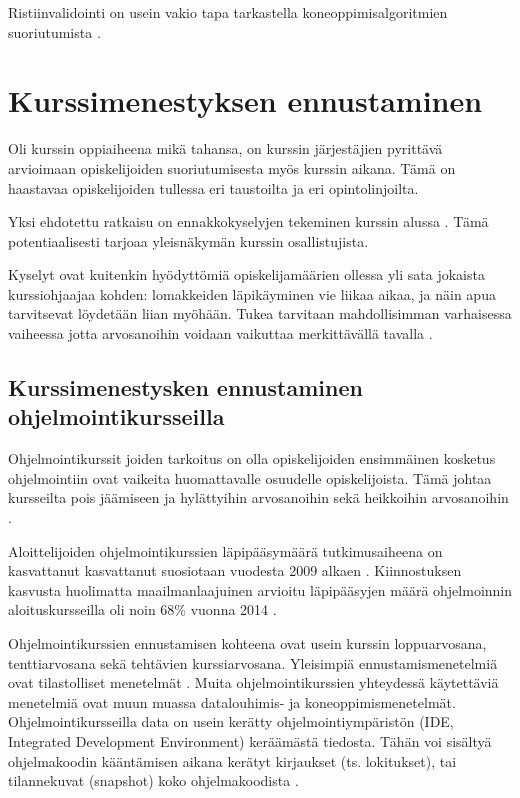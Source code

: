 \documentclass[finnish,twoside,openright]{HYgraduMLDS}
\begin{document}
Ristiinvalidointi on usein vakio tapa tarkastella koneoppimisalgoritmien suoriutumista \cite{james2013ISLR}.

 
\section{Kurssimenestyksen ennustaminen}

Oli kurssin oppiaiheena mikä tahansa, on kurssin järjestäjien pyrittävä arvioimaan opiskelijoiden suoriutumisesta myös kurssin aikana. Tämä on haastavaa opiskelijoiden tullessa eri taustoilta ja eri opintolinjoilta.

Yksi ehdotettu ratkaisu on ennakkokyselyjen tekeminen kurssin alussa \cite{watson2014no}. Tämä potentiaalisesti tarjoaa yleisnäkymän kurssin osallistujista.

Kyselyt ovat kuitenkin hyödyttömiä opiskelijamäärien ollessa yli sata jokaista kurssiohjaajaa kohden: lomakkeiden läpikäyminen vie liikaa aikaa, ja näin apua tarvitsevat löydetään liian myöhään. Tukea tarvitaan mahdollisimman varhaisessa vaiheessa jotta arvosanoihin voidaan vaikuttaa merkittävällä tavalla \cite{bergin2015using}.

\subsection{Kurssimenestysken ennustaminen ohjelmointikursseilla}

Ohjelmointikurssit joiden tarkoitus on olla opiskelijoiden ensimmäinen kosketus ohjelmointiin ovat vaikeita huomattavalle osuudelle opiskelijoista. Tämä johtaa kursseilta pois jäämiseen ja hylättyihin arvosanoihin sekä heikkoihin arvosanoihin \cite{bergin2015using}. 

Aloittelijoiden ohjelmointikurssien läpipääsymäärä tutkimusaiheena on kasvattanut kasvattanut suosiotaan vuodesta 2009 alkaen \cite{hellas2018predicting}. Kiinnostuksen kasvusta huolimatta maailmanlaajuinen arvioitu läpipääsyjen määrä ohjelmoinnin aloituskursseilla oli noin 68\% vuonna 2014 \cite{watson2014failure}. 

Ohjelmointikurssien ennustamisen kohteena ovat usein kurssin loppuarvosana, tenttiarvosana sekä tehtävien kurssiarvosana. Yleisimpiä ennustamismenetelmiä ovat tilastolliset menetelmät \cite{hellas2018predicting}. Muita ohjelmointikurssien yhteydessä käytettäviä menetelmiä ovat muun muassa datalouhimis- ja koneoppimismenetelmät. Ohjelmointikursseilla data on usein kerätty ohjelmointiympäristön (IDE, Integrated Development Environment) keräämästä tiedosta. Tähän voi sisältyä ohjelmakoodin kääntämisen aikana kerätyt kirjaukset (ts. lokitukset), tai tilannekuvat (snapshot) koko ohjelmakoodista \cite{watson2013predicting, jadud2006methods, lagus2018transfer}.
\end{document}
